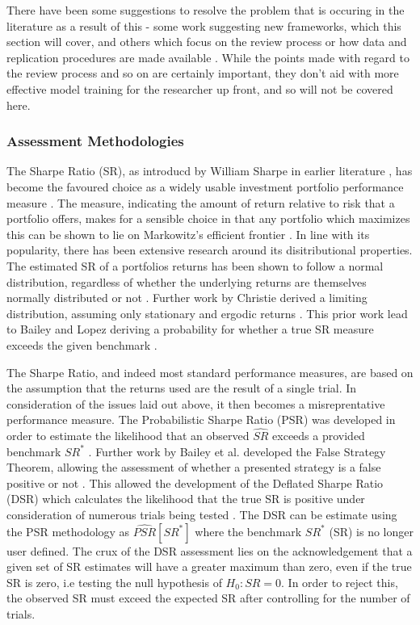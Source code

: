 \documentclass[a4paper,11pt,oneside]{article}
\theoremstyle{plain}
\theoremstyle{definition}
\begin{document}
There have been some suggestions to resolve the problem that is occuring in the literature as a result of this - some 
work suggesting new frameworks, which this section will cover, and others which focus on the review process or 
how data and replication procedures are made available \cite{Prado}. While the points made with regard to the review process 
and so on are certainly important, they don't aid with more effective model training for the researcher up front, and 
so will not be covered here.

\subsubsection{Assessment Methodologies}\label{lr_cscv}


The Sharpe Ratio (SR), as introducd by William Sharpe in earlier literature , has become the favoured choice as a widely usable
investment portfolio performance measure . The measure, indicating the amount of return relative to risk that a portfolio offers, makes for 
a sensible choice in that any portfolio which maximizes this can be shown to lie on Markowitz's efficient frontier . In line with its popularity, there has been 
extensive research around its disitributional properties. The estimated SR of a portfolios returns has been shown to follow a normal distribution, regardless
of whether the underlying returns are themselves normally distributed or not . Further work by Christie derived a limiting distribution, assuming only stationary and ergodic returns . This prior work lead to Bailey and Lopez deriving a probability for whether a true SR measure exceeds the given benchmark .
\hfill \break 

The Sharpe Ratio, and indeed most standard performance measures, are based on the assumption that the returns used are the result of a single trial. In consideration of the issues laid out above, it then becomes a misreprentative performance measure. The Probabilistic Sharpe Ratio (PSR) was developed in order to estimate the likelihood that an observed $\widehat{SR}$ exceeds a provided benchmark $SR^*$ . Further work by Bailey et al. developed the False Strategy Theorem, allowing the assessment of whether a presented strategy is a false positive or not . This allowed the development of the Deflated Sharpe Ratio (DSR) which calculates the likelihood that the true SR is positive under consideration of numerous trials being tested . The DSR can be estimate using the PSR methodology as $\widehat{PSR}[SR^*]$ where the benchmark $SR^{*}$ (SR) is no longer user defined. The crux of the DSR assessment lies on the acknowledgement that a given set of SR estimates will have a greater maximum than zero, even if the true SR is zero, i.e testing the null hypothesis of $H_0:SR=0$. In order to reject this, the observed SR must exceed the expected SR after controlling for the number of trials.
\hfill \break 
\end{document}
